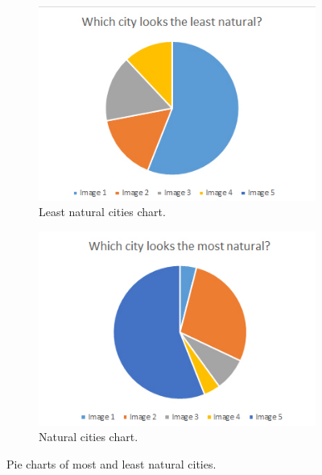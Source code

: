 \begin{figure}[h]
	\begin{subfigure}{0.5\textwidth}
		\centering
		\includegraphics[width=0.9\linewidth]{"Images/LeastNatural"}
		\caption{Least natural cities chart.}
		\label{fig:pie-chart-least-natural}
	\end{subfigure}
	\begin{subfigure}{0.5\textwidth}
		\centering
		\includegraphics[width=0.9\linewidth]{"Images/Natural"}
		\caption{Natural cities chart.}
		\label{fig:pie-chart-natural}
	\end{subfigure}
	\caption{Pie charts of most and least natural cities.}
	\label{fig:pie-chart-natural-least-natural}
\end{figure}

